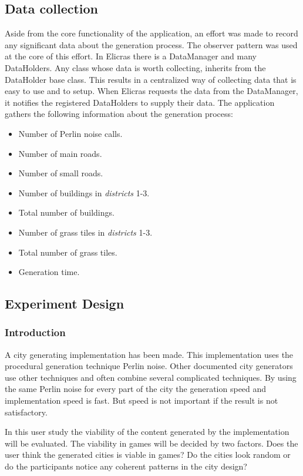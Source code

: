 	\subsection{Data collection}
	Aside from the core functionality of the application, an effort was made to record any significant data about the generation process. The observer pattern was used at the core of this effort. In Elicras there is a DataManager and many DataHolders. Any class whose data is worth collecting, inherits from the DataHolder base class. This results in a centralized way of collecting data that is easy to use and to setup. When Elicras requests the data from the DataManager, it notifies the registered DataHolders to supply their data. The application gathers the following information about the generation process:
		\begin{itemize}
			\item Number of Perlin noise calls.
			\item Number of main roads.
			\item Number of small roads.
			\item Number of buildings in \textit{districts} 1-3.
			\item Total number of buildings.
			\item Number of grass tiles in \textit{districts} 1-3.
			\item Total number of grass tiles.
			\item Generation time.
		\end{itemize}
	
	
	\subsection{Experiment Design}
		\subsubsection{Introduction}
		A city generating implementation has been made. This implementation uses the procedural generation technique Perlin noise. Other documented city generators use other techniques and often combine several complicated techniques. By using the same Perlin noise for every part of the city the generation speed and implementation speed is fast. But speed is not important if the result is not satisfactory.
		
			In this user study the viability of the content generated by the implementation will be evaluated.  The viability in games will be decided by two factors. Does the user think the generated cities is viable in games? Do the cities look random or do the participants notice any coherent patterns in the city design?
			
